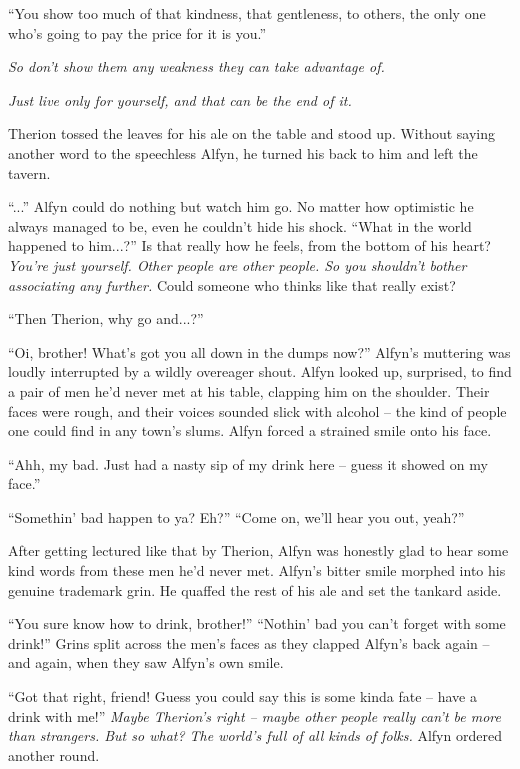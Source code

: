 ``You show too much of that kindness, that gentleness, to others, the only one who's going to pay the price for it is you.''

\emph{So don't show them any weakness they can take advantage of.}

\emph{Just live only for yourself, and that can be the end of it.}

Therion tossed the leaves for his ale on the table and stood up. Without saying another word to the speechless Alfyn, he turned his back to him and left the tavern.

``...'' Alfyn could do nothing but watch him go. No matter how optimistic he always managed to be, even he couldn't hide his shock. ``What in the world happened to him...?'' Is that really how he feels, from the bottom of his heart? \emph{You're just yourself. Other people are other people. So you shouldn't bother associating any further.} Could someone who thinks like that really exist?

``Then Therion, why go and...?''

``Oi, brother! What's got you all down in the dumps now?'' Alfyn's muttering was loudly interrupted by a wildly overeager shout. Alfyn looked up, surprised, to find a pair of men he'd never met at his table, clapping him on the shoulder. Their faces were rough, and their voices sounded slick with alcohol -- the kind of people one could find in any town's slums. Alfyn forced a strained smile onto his face. 

``Ahh, my bad. Just had a nasty sip of my drink here -- guess it showed on my face.''

``Somethin' bad happen to ya? Eh?'' ``Come on, we'll hear you out, yeah?''

After getting lectured like that by Therion, Alfyn was honestly glad to hear some kind words from these men he'd never met. Alfyn's bitter smile morphed into his genuine trademark grin. He quaffed the rest of his ale and set the tankard aside.

``You sure know how to drink, brother!'' ``Nothin' bad you can't forget with some drink!'' Grins split across the men's faces as they clapped Alfyn's back again -- and again, when they saw Alfyn's own smile.

``Got that right, friend! Guess you could say this is some kinda fate -- have a drink with me!'' \emph{Maybe Therion's right -- maybe other people really can't be more than strangers. But so what? The world's full of all kinds of folks.} Alfyn ordered another round.

